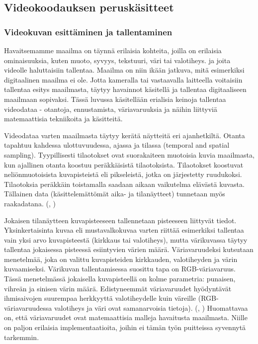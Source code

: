 \subsection{Videokoodauksen peruskäsitteet}

\subsubsection{Videokuvan esittäminen ja tallentaminen}

Havaitsemamme maailma on täynnä erilaisia kohteita, joilla on
erilaisia ominaisuuksia, kuten muoto, syvyys, tekstuuri, väri tai valotiheys.
ja joita videolle haluttaisiin tallentaa. Maailma on niin ikään jatkuva,
mitä esimerkiksi digitaalinen maailma ei ole. Jotta kameralla tai vastaavalla
laitteella voitaisiin tallentaa esitys maailmasta, täytyy havainnot käsitellä ja
tallentaa digitaaliseen maailmaan sopivaksi. Tässä luvussa käsitellään
erialisia keinoja tallentaa videodataa - otantoja, ennustamista, väriavaruuksia
ja näihin liittyviä matemaattisia tekniikoita ja käsitteitä.

Videodataa varten maailmasta täytyy kerätä näytteitä eri ajanhetkiltä. Otanta
tapahtuu kahdessa ulottuvuudessa, ajassa ja tilassa (temporal and spatial
sampling). Tyypillisesti tilaotokset ovat suorakaiteen muotoisia kuvia
maailmasta, kun ajallinen otanta koostuu peräkkäisistä tilaotoksista.
Tilaotokset koostuvat neliönmuotoisista kuvapisteistä eli pikseleistä, jotka
on järjestetty ruudukoksi. Tilaotoksia peräkkäin toistamalla saadaan aikaan
vaikutelma elävästä kuvasta. Tällainen data (käsittelemättömät aika- ja
tilanäytteet) tunnetaan myös raakadatana. (\citealt{h264}, \citealt{du})

Jokaisen tilanäytteen kuvapisteeseen tallennetaan pisteeseen liittyvät
tiedot. Yksinkertaisinta kuvaa eli mustavalkokuvaa varten riittää esimerkiksi
tallentaa vain yksi arvo kuvapisteestä (kirkkaus tai valotiheys), mutta
värikuvassa täytyy tallentaa jokaisessa pisteessä esiintyvien värien määrä.
Väriavaruudeksi kutsutaan menetelmää, joka on valittu kuvapisteiden kirkkauden,
valotiheyden ja värin kuvaamiseksi. Värikuvan tallentamisessa suosittu tapa on
RGB-väriavaruus. Tässä menetelmässä jokaisella kuvapisteellä on
kolme parametria: punaisen, vihreän ja sinisen värin määrä. Edistyneemmät
väriavaruudet hyödyntävät ihmisaivojen suurempaa herkkyyttä valotiheydelle
kuin väreille (RGB-väriavaruudessa valotiheys ja väri ovat samanarvoisia
tietoja). (\citealt{h264}, \citealt{du}) Huomattavaa on, että väriavaruudet ovat matemaattisia
malleja havaitusta maailmasta. Niille on paljon erilaisia implementaatioita,
joihin ei tämän työn puitteissa syvennytä tarkemmin.

